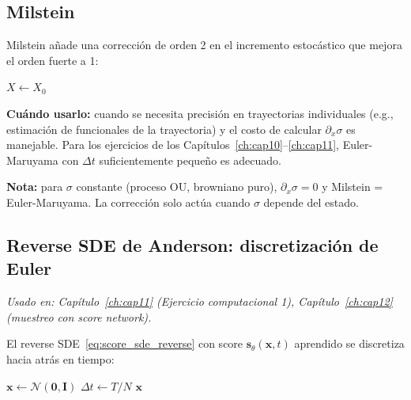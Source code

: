 \subsection{Milstein}
\label{subsec:ap_milstein}

Milstein añade una corrección de orden 2 en el incremento estocástico que
mejora el orden fuerte a 1:

\begin{algorithm}[H]
\caption{Método de Milstein (caso escalar)}
\label{alg:ap_milstein}

$X \leftarrow X_0$\;
\end{algorithm}

\noindent\textbf{Cuándo usarlo:} cuando se necesita precisión en trayectorias
individuales (e.g., estimación de funcionales de la trayectoria) y el costo
de calcular $\partial_x\sigma$ es manejable. Para los ejercicios de los
Capítulos~\ref{ch:cap10}--\ref{ch:cap11}, Euler-Maruyama con $\Delta t$
suficientemente pequeño es adecuado.

\noindent\textbf{Nota:} para $\sigma$ constante (proceso OU, browniano puro),
$\partial_x\sigma = 0$ y Milstein = Euler-Maruyama. La corrección solo actúa
cuando $\sigma$ depende del estado.

\subsection{Reverse SDE de Anderson: discretización de Euler}
\label{subsec:ap_reverse_sde}

\textit{Usado en: Capítulo~\ref{ch:cap11} (Ejercicio computacional 1),
Capítulo~\ref{ch:cap12} (muestreo con score network).}

\medskip
El reverse SDE~\eqref{eq:score_sde_reverse} con score $\bm{s}_\theta(\bm{x},t)$
aprendido se discretiza hacia atrás en tiempo:

\begin{algorithm}[H]
\caption{Muestreo con reverse SDE (discretización de Euler)}
\label{alg:ap_reverse_sde}

$\bm{x} \leftarrow \mathcal{N}(\bm{0}, \bm{I})$
$\Delta t \leftarrow T/N$\;
\Return $\bm{x}$\;
\end{algorithm}

